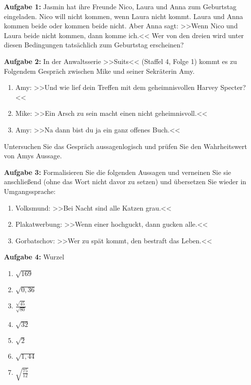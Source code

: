 
\textbf{Aufgabe 1:} \enspace Jasmin hat ihre Freunde Nico, Laura und Anna zum Geburtstag eingeladen. Nico will nicht kommen, wenn Laura nicht kommt. Laura und Anna kommen beide oder kommen beide nicht. Aber Anna sagt: >>Wenn Nico und Laura beide nicht kommen, dann komme ich.<< Wer von den dreien wird unter diesen Bedingungen tatsächlich zum Geburtstag erscheinen?


\textbf{Aufgabe 2:} \enspace In der Anwaltsserie >>Suits<< (Staffel 4, Folge 1) kommt es zu Folgendem Gespräch zwischen Mike und seiner Sekräterin Amy.


\begin{enumerate}[label={\protect\ding{\value*}},start=192]
    \item Amy: >>Und wie lief dein Treffen mit dem geheimnisvollen Harvey Specter?<<
    \item Mike: >>Ein Arsch zu sein macht einen nicht geheimnisvoll.<<
    \item Amy: >>Na dann bist du ja ein ganz offenes Buch.<<
\end{enumerate}

Untersuchen Sie das Gespräch aussagenlogisch und prüfen Sie den Wahrheitswert von Amys Aussage.


\textbf{Aufgabe 3:} \enspace Formalisieren Sie die folgenden Aussagen und verneinen Sie sie anschließend (ohne das Wort nicht davor zu setzen) und übersetzen Sie wieder in Umgangssprache:

\begin{enumerate}[label=(\alph*)]
    \item Volksmund: >>Bei Nacht sind alle Katzen grau.<<
    \item Plakatwerbung: >>Wenn einer hochguckt, dann gucken alle.<<
    \item Gorbatschov: >>Wer zu spät kommt, den bestraft das Leben.<<
\end{enumerate}

\textbf{Aufgabe 4:} \enspace Wurzel

\begin{multicols}{3}
    \begin{enumerate}[label=(\alph*)]
        \item $\sqrt{169}$
        \item $\sqrt{0,36}$
        \item $\frac{\sqrt{45}}{\sqrt{80}}$
        \item $\sqrt{32}$
        \item $\sqrt{2}$
        \item $\sqrt{1,44}$
        \item $\sqrt{\frac{75}{12}}$
    \end{enumerate}
\end{multicols}